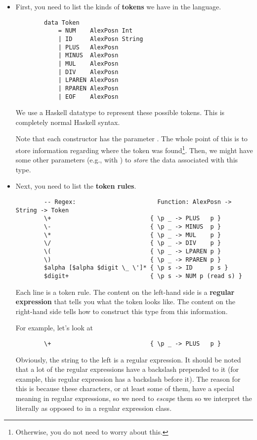 \documentclass[letterpaper]{article}
\begin{document}
\begin{itemize}
    \item First, you need to list the kinds of \textbf{tokens} we have in the language.
    \begin{verbatim}
        data Token
            = NUM    AlexPosn Int
            | ID     AlexPosn String
            | PLUS   AlexPosn
            | MINUS  AlexPosn
            | MUL    AlexPosn
            | DIV    AlexPosn
            | LPAREN AlexPosn
            | RPAREN AlexPosn
            | EOF    AlexPosn\end{verbatim}
    We use a Haskell datatype to represent these possible tokens. This is completely normal Haskell syntax.
    
    \bigskip 
    
    Note that each constructor has the parameter . The whole point of this is to store information regarding where the token was found\footnote{Otherwise, you do not need to worry about this.}. Then, we might have some other parameters (e.g.,  with ) to \emph{store} the data associated with this type.

    \item Next, you need to list the \textbf{token rules}.
    \begin{verbatim}
        -- Regex:                       Function: AlexPosn -> String -> Token
        \+                            { \p _ -> PLUS   p }
        \-                            { \p _ -> MINUS  p }
        \*                            { \p _ -> MUL    p }
        \/                            { \p _ -> DIV    p }
        \(                            { \p _ -> LPAREN p }
        \)                            { \p _ -> RPAREN p }
        $alpha [$alpha $digit \_ \']* { \p s -> ID     p s }
        $digit+                       { \p s -> NUM p (read s) }\end{verbatim}
    Each line is a token rule. The content on the left-hand side is a \textbf{regular expression} that tells you what the token looks like. The content on the right-hand side tells  how to construct this  type from this information. 

    \bigskip 

    For example, let's look at 
    \begin{verbatim}
        \+                            { \p _ -> PLUS   p }\end{verbatim}
    Obviously, the string to the left is a regular expression. It should be noted that a lot of the regular expressions have a backslash prepended to it (for example, this \code{+} regular expression has a backslash before it). The reason for this is because these characters, or at least some of them, have a special meaning in regular expressions, so we need to \emph{escape} them so we interpret the \code{+} literally as opposed to in a regular expression class. 


\end{itemize}
\end{document}
